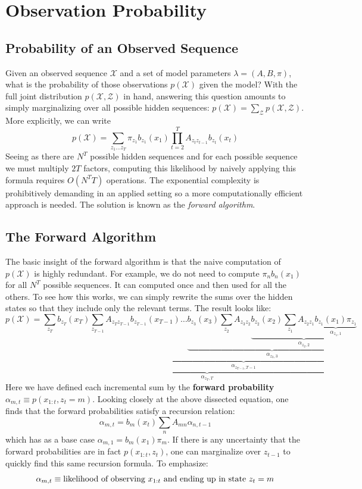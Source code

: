 \documentclass[onecolumn]{gwclass}
\begin{document}
	
	\section{Observation Probability}
	\subsection{Probability of an Observed Sequence}
	Given an observed sequence $\mathcal{X}$ and a set of model parameters $\lambda = (A,B,\pi)$, what is the probability of those observations $p(\mathcal{X})$ given the model? With the full joint distribution $p(\mathcal{X},\mathcal{Z})$ in hand, answering this question amounts to simply marginalizing over all possible hidden sequences: $p(\mathcal{X})=\sum_{\mathcal{Z}}p(\mathcal{X},\mathcal{Z})$. More explicitly, we can write
	$$ p(\mathcal{X}) = \sum_{z_1\dots z_T}\pi_{z_1}b_{z_1}(x_1) \prod_{t=2}^TA_{z_tz_{t-1}}b_{z_t}(x_t) $$
	Seeing as there are $N^T$ possible hidden sequences and for each possible sequence we must multiply $2T$ factors, computing this likelihood by naively applying this formula requires $O(N^T T)$ operations. The exponential complexity is prohibitively demanding in an applied setting so a more computationally efficient approach is needed. The solution is known as the \emph{forward algorithm}.
	\subsection{The Forward Algorithm}
	The basic insight of the forward algorithm is that the naive computation of $p(\mathcal{X})$ is highly redundant. For example, we do not need to compute $\pi_n b_n(x_1)$ for all $N^T$ possible sequences. It can computed once and then used for all the others. To see how this works, we can simply rewrite the sums over the hidden states so that they include only the relevant terms. The result looks like:
	$$ p(\mathcal{X}) = \sum_{ z_T}\underbrace{b_{z_T}(x_T) \sum_{z_{T-1}}A_{z_Tz_{T-1}} \underbrace{b_{z_{T-1}}(x_{T-1})\dots \underbrace{b_{z_3}(x_3)\sum_{z_2}A_{z_3z_2} \underbrace{b_{z_2}(x_2)\sum_{z_1}A_{z_2z_1}\underbrace{b_{z_1}(x_1)\pi_{z_1}}_{\alpha_{z_1,1}}}_{\alpha_{z_2,2}}}_{\alpha_{z_3,3}}}_{\alpha_{z_{T-1},T-1}}}_{\alpha_{z_T,T}}$$
	Here we have defined each incremental sum by the \textbf{forward probability} $\alpha_{m,t}\equiv p(x_{1:t},z_t=m)$. Looking closely at the above dissected equation, one finds that the forward probabilities satisfy a recursion relation:
	$$ \alpha_{m,t} = b_m(x_t) \sum_n A_{mn} \alpha_{n,t-1}$$
	which has as a base case $\alpha_{m,1}=b_m(x_1)\pi_m$. If there is any uncertainty that the forward probabilities are in fact $p(x_{1:t}, z_t)$, one can marginalize over $z_{t-1}$ to quickly find this same recursion formula. To emphasize:
	$$ \alpha_{m,t} \equiv \text{\normalfont{likelihood of observing $x_{1:t}$ and ending up in state $z_t=m$}} $$
	
\end{document}
